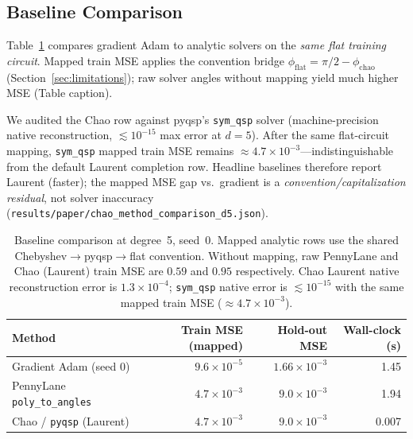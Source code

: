 \documentclass[11pt,a4paper]{article}
\begin{document}
\subsection{Baseline Comparison}

Table~\ref{tab:baseline} compares gradient Adam to analytic solvers on the \emph{same flat training circuit}. Mapped train MSE applies the convention bridge $\phi_{\mathrm{flat}}=\pi/2-\phi_{\mathrm{chao}}$ (Section~\ref{sec:limitations}); raw solver angles without mapping yield much higher MSE (Table caption).

We audited the Chao row against pyqsp's \texttt{sym\_qsp} solver (machine-precision native reconstruction, $\lesssim10^{-15}$ max error at $d=5$). After the same flat-circuit mapping, \texttt{sym\_qsp} mapped train MSE remains $\approx4.7\times10^{-3}$---indistinguishable from the default Laurent completion row. Headline baselines therefore report Laurent (faster); the mapped MSE gap vs.\ gradient is a \emph{convention/capitalization residual}, not solver inaccuracy (\texttt{results/paper/chao\_method\_comparison\_d5.json}).

\begin{table}[ht]
\centering\small
\begin{tabular}{@{} l r r r @{}}
  \toprule
  \textbf{Method} & \textbf{Train MSE (mapped)} & \textbf{Hold-out MSE} & \textbf{Wall-clock (s)} \\
  \midrule
  Gradient Adam (seed 0) & $9.6\times10^{-5}$ & $1.66\times10^{-3}$ & 1.45 \\
  PennyLane \texttt{poly\_to\_angles} & $4.7\times10^{-3}$ & $9.0\times10^{-3}$ & 1.94 \\
  Chao / \texttt{pyqsp} (Laurent) & $4.7\times10^{-3}$ & $9.0\times10^{-3}$ & 0.007 \\
  \bottomrule
\end{tabular}
\caption{Baseline comparison at degree~5, seed~0. Mapped analytic rows use the shared Chebyshev$\to$pyqsp$\to$flat convention. Without mapping, raw PennyLane and Chao (Laurent) train MSE are $0.59$ and $0.95$ respectively. Chao Laurent native reconstruction error is $1.3\times10^{-4}$; \texttt{sym\_qsp} native error is $\lesssim10^{-15}$ with the same mapped train MSE ($\approx4.7\times10^{-3}$).}
\label{tab:baseline}
\end{table}
\end{document}
